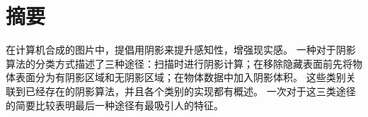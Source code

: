 \section{摘要}
在计算机合成的图片中，提倡用阴影来提升感知性，增强现实感。
一种对于阴影算法的分类方式描述了三种途径：扫描时进行阴影计算；在移除隐藏表面前先将物体表面分为有阴影区域和无阴影区域；在物体数据中加入阴影体积。
这些类别关联到已经存在的阴影算法，并且各个类别的实现都有概述。
一次对于这三类途径的简要比较表明最后一种途径有最吸引人的特征。